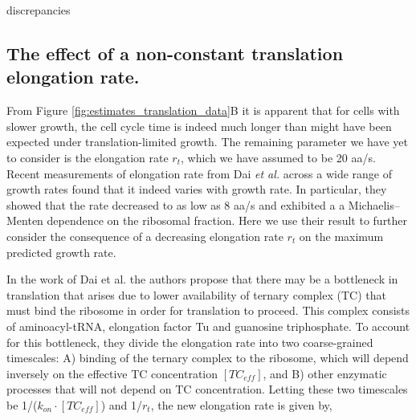 discrepancies \documentclass[11pt, letterpaper]{article}
\begin{document}
\subsection{The effect of a non-constant translation elongation rate.}

From Figure \ref{fig:estimates_translation_data}B it is apparent that for cells
with slower growth, the cell cycle time is indeed much longer than might have
been expected under translation-limited growth. The remaining parameter we have yet to
consider is the elongation rate $r_t$, which we have assumed to be 20 aa/s. Recent
measurements of elongation rate from Dai {\it et al.} \cite{Dai2016} across a
wide range of growth rates found that it indeed varies with growth rate. In particular,
they showed that the rate decreased to as low as 8 aa/s and exhibited a a Michaelis–Menten dependence on the
ribosomal fraction. Here we use their result to further consider the consequence of a
decreasing elongation rate $r_t$ on the maximum predicted growth rate.

%
%


In the work of Dai et al. the authors propose that there may be a bottleneck in
translation that arises due to lower  availability of ternary complex (TC)
that must bind the ribosome in order for translation to proceed. This complex
consists of aminoacyl-tRNA, elongation factor Tu and guanosine triphosphate.
To account for this bottleneck, they divide the elongation rate into two
coarse-grained timescales: A) binding of the ternary complex to the ribosome,
which will depend inversely on the effective TC concentration $[TC_{eff}]$, and
B) other enzymatic processes that will not depend
on TC concentration. Letting these two timescales be 1/($k_{on} \cdot
[TC_{eff}]$) and 1/$r_t$, the new elongation rate is given by,
\end{document}
